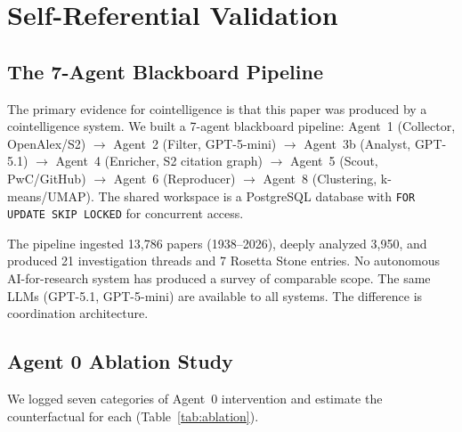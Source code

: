 \documentclass{article}
\begin{document}



\section{Self-Referential Validation}
\label{sec:validation}

\subsection{The 7-Agent Blackboard Pipeline}
\label{sec:pipeline}

The primary evidence for cointelligence is that this paper was produced
by a cointelligence system. We built a 7-agent blackboard pipeline:
Agent~1 (Collector, OpenAlex/S2) $\to$ Agent~2 (Filter, GPT-5-mini)
$\to$ Agent~3b (Analyst, GPT-5.1) $\to$ Agent~4 (Enricher, S2 citation
graph) $\to$ Agent~5 (Scout, PwC/GitHub) $\to$ Agent~6 (Reproducer)
$\to$ Agent~8 (Clustering, k-means/UMAP). The shared workspace is a
PostgreSQL database with \texttt{FOR UPDATE SKIP LOCKED} for concurrent
access.

The pipeline ingested 13,786 papers (1938--2026), deeply analyzed 3,950,
and produced 21 investigation threads and 7 Rosetta Stone entries. No
autonomous AI-for-research system has produced a survey of comparable
scope. The same LLMs (GPT-5.1, GPT-5-mini) are available to all
systems. The difference is coordination architecture.


\subsection{Agent 0 Ablation Study}
\label{sec:ablation}

We logged seven categories of Agent~0 intervention and estimate the
counterfactual for each (Table~\ref{tab:ablation}).
\end{document}
